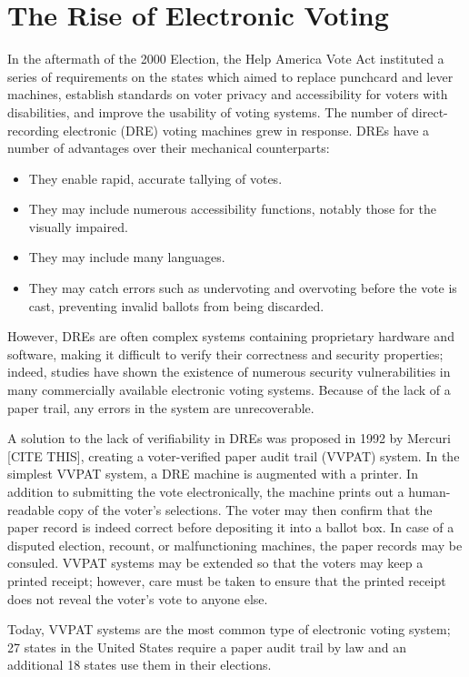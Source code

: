 \section{The Rise of Electronic Voting}

In the aftermath of the 2000 Election, the Help America Vote Act instituted a series of requirements on the states which aimed to replace punchcard and lever machines, establish standards on voter privacy and accessibility for voters with disabilities, and improve the usability of voting systems. The number of direct-recording electronic (DRE) voting machines grew in response. DREs have a number of advantages over their mechanical counterparts:

\begin{itemize}
\item They enable rapid, accurate tallying of votes.
\item They may include numerous accessibility functions, notably those for the visually impaired.
\item They may include many languages.
\item They may catch errors such as undervoting and overvoting before the vote is cast, preventing invalid ballots from being discarded.
\end{itemize}

However, DREs are often complex systems containing proprietary hardware and software, making it difficult to verify their correctness and security properties; indeed, studies have shown the existence of numerous security vulnerabilities in many commercially available electronic voting systems. Because of the lack of a paper trail, any errors in the system are unrecoverable.

A solution to the lack of verifiability in DREs was proposed in 1992 by Mercuri [CITE THIS], creating a voter-verified paper audit trail (VVPAT) system. In the simplest VVPAT system, a DRE machine is augmented with a printer. In addition to submitting the vote electronically, the machine prints out a human-readable copy of the voter's selections. The voter may then confirm that the paper record is indeed correct before depositing it into a ballot box. In case of a disputed election, recount, or malfunctioning machines, the paper records may be consuled. VVPAT systems may be extended so that the voters may keep a printed receipt; however, care must be taken to ensure that the printed receipt does not reveal the voter's vote to anyone else.

Today, VVPAT systems are the most common type of electronic voting system; 27 states in the United States require a paper audit trail by law and an additional 18 states use them in their elections.


